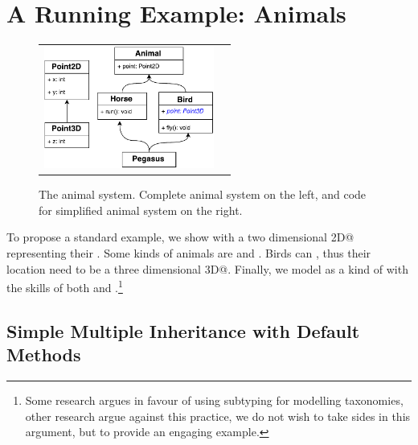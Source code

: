 \section{A Running Example: Animals}\label{sec:ep}

\begin{figure}
\begin{tabular}{c|c}
\includegraphics[height=4cm]{PegasusDetail.pdf}\hspace{20pt} &
\begin{minipage}{7cm}
\vspace{-90pt}
\end{minipage}
\end{tabular}
\caption{The animal system. Complete animal system on the left, and code for simplified animal system on the right. }\label{fig:pegasus}
\end{figure}

To propose a standard example, we show \Q@Animal@s with a two dimensional \Q@Point2D@ representing their \Q@location@.
Some kinds of animals are \Q@Horse@s and \Q@Bird@s.
Birds can \Q@fly@, thus their location need to be a three dimensional \Q@Point3D@.
Finally, we model \Q@Pegasus@ as a kind of \Q@Animal@ with the skills of both \Q@Horse@s and \Q@Bird@s.\footnote{
Some research argues in favour of using subtyping for modelling taxonomies, other research argue against this practice, we do not wish to take sides in this argument, but to provide an engaging example.}

\subsection{Simple Multiple Inheritance with Default Methods}

